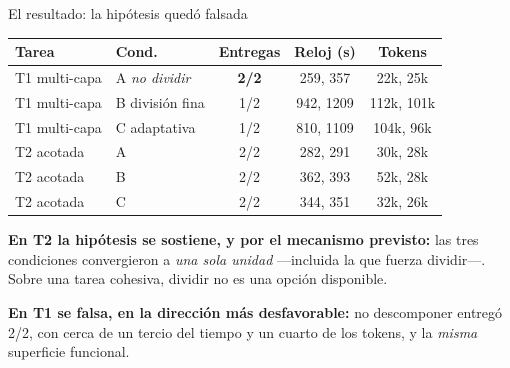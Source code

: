 \documentclass[10pt,aspectratio=169]{beamer}
\begin{document}
\begin{frame}{El resultado: la hipótesis quedó falsada}
  \small
  \begin{center}
  \begin{tabular}{llccc}
    \toprule
    \textbf{Tarea} & \textbf{Cond.} & \textbf{Entregas} & \textbf{Reloj (s)} & \textbf{Tokens} \\
    \midrule
    T1 multi-capa & A \emph{no dividir} & \textbf{2/2} & 259, 357 & 22k, 25k \\
    T1 multi-capa & B división fina & 1/2 & 942, 1209 & 112k, 101k \\
    T1 multi-capa & C adaptativa & 1/2 & 810, 1109 & 104k, 96k \\
    \midrule
    T2 acotada & A & 2/2 & 282, 291 & 30k, 28k \\
    T2 acotada & B & 2/2 & 362, 393 & 52k, 28k \\
    T2 acotada & C & 2/2 & 344, 351 & 32k, 26k \\
    \bottomrule
  \end{tabular}
  \end{center}

  \bigskip
  \pause
  \textbf{En T2 la hipótesis se sostiene, y por el mecanismo previsto:} las tres
  condiciones convergieron a \emph{una sola unidad} —incluida la que fuerza
  dividir—. Sobre una tarea cohesiva, dividir no es una opción disponible.

  \bigskip
  \pause
  \textbf{En T1 se falsa, en la dirección más desfavorable:} no descomponer
  entregó 2/2, con cerca de un tercio del tiempo y un cuarto de los tokens, y la \emph{misma}
  superficie funcional.
\end{frame}
\end{document}
